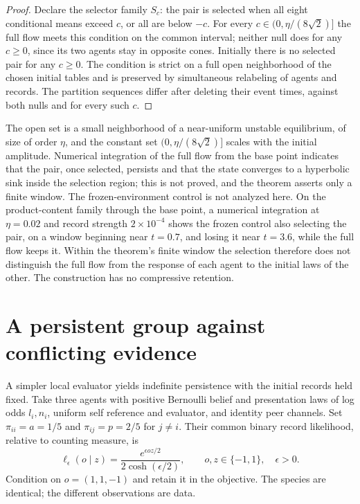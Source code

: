 \begin{proof}
Declare the selector family $S_c$: the pair is selected when all eight conditional means exceed $c$, or all are below $-c$. For every $c\in(0,\eta/(8\sqrt2)]$ the full flow meets this condition on the common interval; neither null does for any $c\geq0$, since its two agents stay in opposite cones. Initially there is no selected pair for any $c\geq0$. The condition is strict on a full open neighborhood of the chosen initial tables and is preserved by simultaneous relabeling of agents and records. The partition sequences differ after deleting their event times, against both nulls and for every such $c$.
\end{proof}

The open set is a small neighborhood of a near-uniform unstable equilibrium, of size of order $\eta$, and the constant set $(0,\eta/(8\sqrt2)]$ scales with the initial amplitude. Numerical integration of the full flow from the base point indicates that the pair, once selected, persists and that the state converges to a hyperbolic sink inside the selection region; this is not proved, and the theorem asserts only a finite window. The frozen-environment control is not analyzed here. On the product-content family through the base point, a numerical integration at $\eta=0.02$ and record strength $2\times10^{-4}$ shows the frozen control also selecting the pair, on a window beginning near $t=0.7$, and losing it near $t=3.6$, while the full flow keeps it. Within the theorem's finite window the selection therefore does not distinguish the full flow from the response of each agent to the initial laws of the other. The construction has no compressive retention.

\section{A persistent group against conflicting evidence}

A simpler local evaluator yields indefinite persistence with the initial records held fixed. Take three agents with positive Bernoulli belief and presentation laws of log odds $l_i,n_i$, uniform self reference and evaluator, and identity peer channels. Set $\pi_{ii}=a=1/5$ and $\pi_{ij}=p=2/5$ for $j\ne i$. Their common binary record likelihood, relative to counting measure, is
\begin{equation}
 \ell_\epsilon(o\mid z)=\frac{e^{\epsilon oz/2}}{2\cosh(\epsilon/2)},
 \qquad o,z\in\{-1,1\},\quad \epsilon>0.
 \label{pa:bit-record}
\end{equation}
Condition on $o=(1,1,-1)$ and retain it in the objective. The species are identical; the different observations are data.

